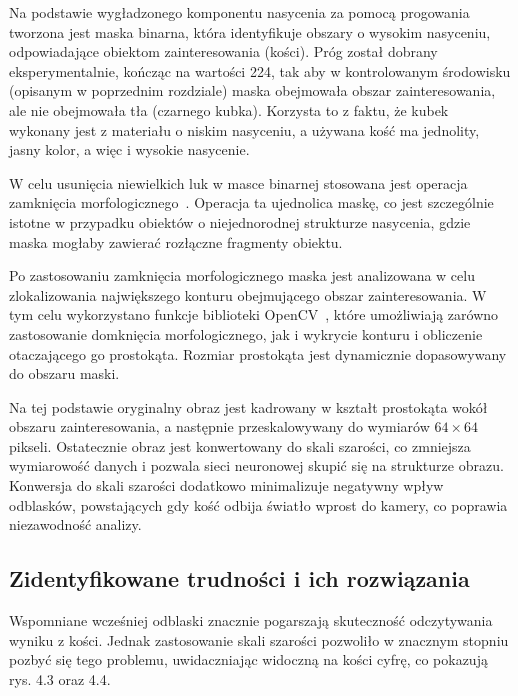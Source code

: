 Na podstawie wygładzonego komponentu nasycenia za pomocą progowania tworzona jest maska binarna,
która identyfikuje obszary o wysokim nasyceniu, odpowiadające obiektom zainteresowania (kości).
Próg został dobrany eksperymentalnie, kończąc na wartości 224,
tak aby w kontrolowanym środowisku (opisanym w poprzednim rozdziale) maska obejmowała obszar zainteresowania,
ale nie obejmowała tła (czarnego kubka).
Korzysta to z faktu, że kubek wykonany jest z materiału o niskim nasyceniu,
a używana kość ma jednolity, jasny kolor, a więc i wysokie nasycenie.

W celu usunięcia niewielkich luk w masce binarnej stosowana jest operacja zamknięcia morfologicznego~\cite{morphological_closure}.
Operacja ta ujednolica maskę, co jest szczególnie istotne w przypadku obiektów o niejednorodnej strukturze nasycenia,
gdzie maska mogłaby zawierać rozłączne fragmenty obiektu.

Po zastosowaniu zamknięcia morfologicznego maska jest analizowana w celu
zlokalizowania największego konturu obejmującego obszar zainteresowania.
W tym celu wykorzystano funkcje biblioteki OpenCV~\cite{opencv_docs},
które umożliwiają zarówno zastosowanie domknięcia morfologicznego, jak i wykrycie konturu i obliczenie otaczającego go prostokąta.
Rozmiar prostokąta jest dynamicznie dopasowywany do obszaru maski.

Na tej podstawie oryginalny obraz jest kadrowany w kształt prostokąta wokół obszaru zainteresowania,
a następnie przeskalowywany do wymiarów $64 \times 64$ pikseli.
Ostatecznie obraz jest konwertowany do skali szarości, co zmniejsza wymiarowość danych
i pozwala sieci neuronowej skupić się na strukturze obrazu.
Konwersja do skali szarości dodatkowo minimalizuje negatywny wpływ odblasków,
powstających gdy kość odbija światło wprost do kamery, co poprawia niezawodność analizy.



\subsection{Zidentyfikowane trudności i ich rozwiązania}\label{subsec:zidentyfikowane-trudnosci-i-ich-rozwiazania}

Wspomniane wcześniej odblaski znacznie pogarszają skuteczność odczytywania wyniku z kości.
Jednak zastosowanie skali szarości pozwoliło w znacznym stopniu pozbyć się tego problemu,
uwidaczniając widoczną na kości cyfrę, co pokazują rys. 4.3 oraz 4.4.

